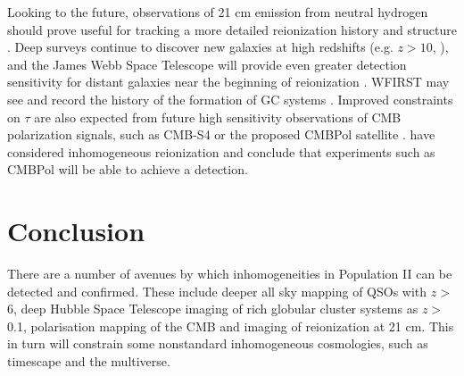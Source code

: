 \documentclass[]{pasa}
\begin{document}
Looking to the future, observations of 21 cm emission from neutral hydrogen should prove useful for tracking a more 
detailed reionization history and structure \citep{Jacobs2016}. 
Deep surveys continue to discover 
new galaxies at high redshifts (e.g. $z > 10$, \cite{Oesch2016}), and the James Webb Space Telescope will provide even greater
 detection sensitivity for distant galaxies near the beginning of reionization \citep{Wang2017}. WFIRST may see and record the history of the formation of GC systems \citep{Renzini2017}.
Improved constraints on $\tau$ are also expected from future high sensitivity observations of CMB polarization signals, such as CMB-S4 \citep{cmbs4} or the proposed CMBPol satellite \citep{Zaldarriaga2008}.  
\cite{Su2011} have considered inhomogeneous reionization and conclude that experiments such as CMBPol will be able to achieve a detection.


\section{Conclusion}
There are a number of avenues by which inhomogeneities in Population II can be detected and confirmed. These include deeper all sky mapping of QSOs with $z >$ 6, deep Hubble Space Telescope imaging of rich globular cluster systems as $z >$ 0.1, polarisation mapping of the CMB and imaging of reionization at 21 cm. This in turn will constrain some nonstandard inhomogeneous cosmologies, such as timescape and the multiverse.
\end{document}
